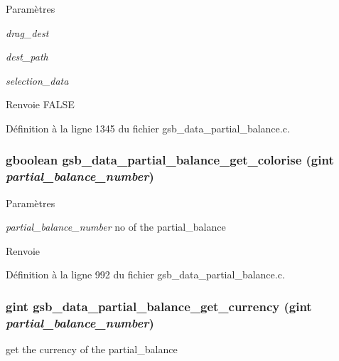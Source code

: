 \begin{DoxyParams}{Paramètres}
\item[{\em drag\_\-dest}]\item[{\em dest\_\-path}]\item[{\em selection\_\-data}]\end{DoxyParams}
\begin{DoxyReturn}{Renvoie}
FALSE 
\end{DoxyReturn}


Définition à la ligne 1345 du fichier gsb\_\-data\_\-partial\_\-balance.c.

\subsubsection[{gsb\_\-data\_\-partial\_\-balance\_\-get\_\-colorise}]{\setlength{\rightskip}{0pt plus 5cm}gboolean gsb\_\-data\_\-partial\_\-balance\_\-get\_\-colorise (gint {\em partial\_\-balance\_\-number})}\label{gsb__data__partial__balance_8c_aa45781dd7d5f787326c68fd88af26104}

\begin{DoxyParams}{Paramètres}
\item[{\em partial\_\-balance\_\-number}]no of the partial\_\-balance\end{DoxyParams}
\begin{DoxyReturn}{Renvoie}

\end{DoxyReturn}


Définition à la ligne 992 du fichier gsb\_\-data\_\-partial\_\-balance.c.

\subsubsection[{gsb\_\-data\_\-partial\_\-balance\_\-get\_\-currency}]{\setlength{\rightskip}{0pt plus 5cm}gint gsb\_\-data\_\-partial\_\-balance\_\-get\_\-currency (gint {\em partial\_\-balance\_\-number})}\label{gsb__data__partial__balance_8c_adc46165b029838315336eabdd6df6e63}
get the currency of the partial\_\-balance


